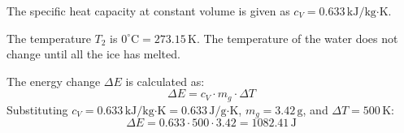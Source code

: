 The specific heat capacity at constant volume is given as \( c_V = 0.633 \, \text{kJ/kg·K} \).  

The temperature \( T_2 \) is \( 0^\circ\text{C} = 273.15 \, \text{K} \). The temperature of the water does not change until all the ice has melted.  

The energy change \( \Delta E \) is calculated as:  
\[
\Delta E = c_V \cdot m_g \cdot \Delta T
\]  
Substituting \( c_V = 0.633 \, \text{kJ/kg·K} = 0.633 \, \text{J/g·K} \), \( m_g = 3.42 \, \text{g} \), and \( \Delta T = 500 \, \text{K} \):  
\[
\Delta E = 0.633 \cdot 500 \cdot 3.42 = 1082.41 \, \text{J}
\]